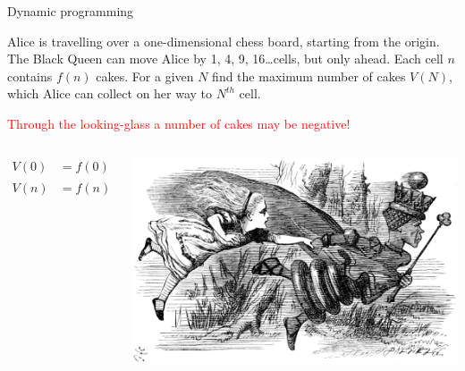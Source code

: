 \documentclass[handout]{beamer}
\def\le{\leqslant}
\begin{document}
\begin{frame}[fragile]{Dynamic programming}

\begin{problem}
Alice is travelling over a one-dimensional chess board,
starting from the origin.
The Black Queen can move Alice
by 1, 4, 9, 16\dots cells, but only ahead.
Each cell $n$ contains $f(n)$ cakes.
For a given $N$ find
the maximum number of cakes $V(N)$, which Alice can collect
on her way to $N^{th}$ cell.
\end{problem}

\centerline{\textcolor{red}{
Through the looking-glass
a number of cakes may be negative!
}
}

\begin{columns}[T]
  \begin{column}{.5\textwidth}

  \begin{align*}
  V(0) &= f(0) \\
  V(n) &= f(n) + \max_{1 \le k \le \sqrt{n}} V(n - k^2)
  \end{align*}

\end{column}

\begin{column}{.5\textwidth}
  \includegraphics[width=1.13\textwidth]{alice-and-queen.png}
\end{column}

\end{columns}


\end{frame}
\end{document}
